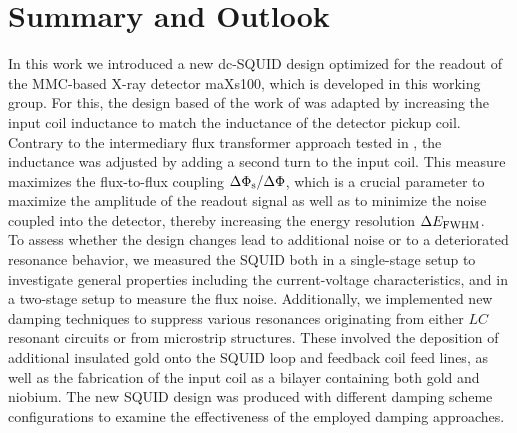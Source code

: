 \chapter{Summary and Outlook}

In this work we introduced a new dc-SQUID design optimized for the readout of the MMC-based X-ray detector maXs100, which is developed in this working group. For this, the design based of the work of \cite{Bauer2022} was adapted by increasing the input coil inductance to match the inductance of the detector pickup coil. Contrary to the intermediary flux transformer approach tested in \cite{Bauer2022}, the inductance was adjusted by adding a second turn to the input coil. This measure maximizes the flux-to-flux coupling $\Delta\Phi_{\rm s}/\Delta\Phi$, which is a crucial parameter to maximize the amplitude of the readout signal as well as to minimize the noise coupled into the detector, thereby increasing the energy resolution $\Delta E_{\rm FWHM}$. \\

To assess whether the design changes lead to additional noise or to a deteriorated resonance behavior, we measured the SQUID both in a single-stage setup to investigate general properties including the current-voltage characteristics, and in a two-stage setup to measure the flux noise. Additionally, we implemented new damping techniques to suppress various resonances originating from either $LC$ resonant circuits or from microstrip structures. These involved the deposition of additional insulated gold onto the SQUID loop and feedback coil feed lines, as well as the fabrication of the input coil as a bilayer containing both gold and niobium. The new SQUID design was produced with different damping scheme configurations to examine the effectiveness of the employed damping approaches. \\


